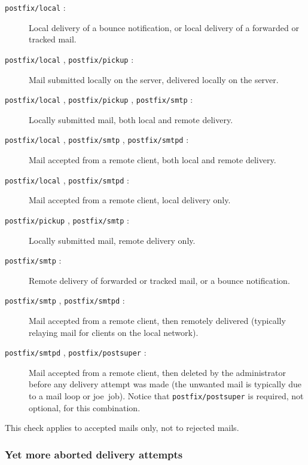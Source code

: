 \documentclass[a4paper,12pt,draft]{article}
\newcommand{\daemon}[1]{%
    \texttt{postfix/#1}%
}
\begin{document}
\begin{description}

    \item [\daemon{local}:] Local delivery of a bounce notification, or
        local delivery of a forwarded or tracked mail.

    \item [\daemon{local}, \daemon{pickup}:] Mail submitted locally on the
        server, delivered locally on the server.

    \item [\daemon{local}, \daemon{pickup}, \daemon{smtp}:] Locally
        submitted mail, \newline both local and remote delivery.

    \item [\daemon{local}, \daemon{smtp}, \daemon{smtpd}:] Mail accepted
        from a remote client, both local and remote delivery.

    \item [\daemon{local}, \daemon{smtpd}:] Mail accepted from a remote
        client, local delivery only.

    \item [\daemon{pickup}, \daemon{smtp}:] Locally submitted mail, remote
        delivery only.

    \item [\daemon{smtp}:] Remote delivery of forwarded or tracked mail, or
        a bounce notification.

    \item [\daemon{smtp}, \daemon{smtpd}:] Mail accepted from a remote
        client, then remotely delivered (typically relaying mail for
        clients on the local network).

    \item [\daemon{smtpd}, \daemon{postsuper}:] Mail accepted from a remote
        client, then deleted by the administrator before any delivery
        attempt was made (the unwanted mail is typically due to a mail loop
        or joe~job).  Notice that \daemon{postsuper} is required, not
        optional, for this combination.

\end{description}

This check applies to accepted mails only, not to rejected mails.

\subsubsection{Yet more aborted delivery attempts}
\end{document}
